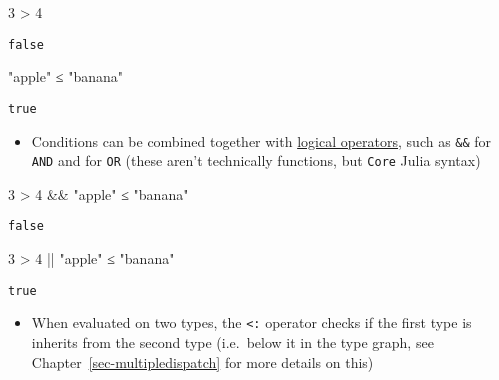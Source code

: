 \documentclass[
  letterpaper,
  DIV=11,
  numbers=noendperiod]{scrreprt}
\newenvironment{Shaded}{\begin{snugshade}}{\end{snugshade}}
\newcommand{\FloatTok}[1]{\textcolor[rgb]{0.68,0.00,0.00}{#1}}
\newcommand{\OperatorTok}[1]{\textcolor[rgb]{0.37,0.37,0.37}{#1}}
\newcommand{\StringTok}[1]{\textcolor[rgb]{0.13,0.47,0.30}{#1}}
\providecommand{\tightlist}{%
  \setlength{\itemsep}{0pt}\setlength{\parskip}{0pt}}\usepackage{longtable,booktabs,array}
\begin{document}
\begin{Shaded}
\begin{Highlighting}[]
\FloatTok{3} \OperatorTok{\textgreater{}} \FloatTok{4}
\end{Highlighting}
\end{Shaded}

\begin{verbatim}
false
\end{verbatim}

\begin{Shaded}
\begin{Highlighting}[]
\StringTok{"apple"} \OperatorTok{≤} \StringTok{"banana"}
\end{Highlighting}
\end{Shaded}

\begin{verbatim}
true
\end{verbatim}

\begin{itemize}
\tightlist
\item
  Conditions can be combined together with
  \href{https://en.wikipedia.org/wiki/Logic_gate}{logical operators},
  such as \texttt{\&\&} for \texttt{AND} and
  \texttt{\textbar{}\textbar{}} for \texttt{OR} (these aren't
  technically functions, but \texttt{Core} Julia syntax)
\end{itemize}

\begin{Shaded}
\begin{Highlighting}[]
\FloatTok{3} \OperatorTok{\textgreater{}} \FloatTok{4} \OperatorTok{\&\&} \StringTok{"apple"} \OperatorTok{≤} \StringTok{"banana"}
\end{Highlighting}
\end{Shaded}

\begin{verbatim}
false
\end{verbatim}

\begin{Shaded}
\begin{Highlighting}[]
\FloatTok{3} \OperatorTok{\textgreater{}} \FloatTok{4} \OperatorTok{||} \StringTok{"apple"} \OperatorTok{≤} \StringTok{"banana"}
\end{Highlighting}
\end{Shaded}

\begin{verbatim}
true
\end{verbatim}

\begin{itemize}
\tightlist
\item
  When evaluated on two types, the \texttt{\textless{}:} operator checks
  if the first type is inherits from the second type (i.e.~below it in
  the type graph, see Chapter~\ref{sec-multipledispatch} for more
  details on this)
\end{itemize}
\end{document}

